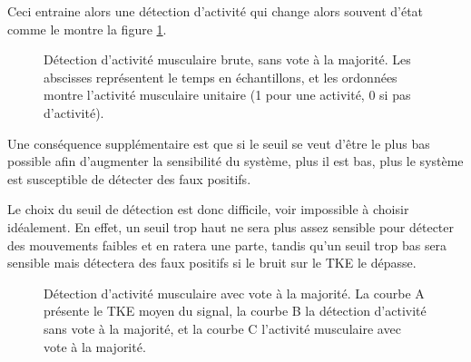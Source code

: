 \documentclass[letterpaper, twoside, 12pt, memoire, creativecommons, hyperref]{thETS}
\begin{document}
Ceci entraine alors une détection d'activité qui change alors souvent d'état comme le montre la figure \ref{fig:onsetSansVote}.

\begin{figure}
	\centering
	\caption{Détection d'activité musculaire brute, sans vote à la majorité. Les abscisses représentent le temps en échantillons, et les ordonnées montre l'activité musculaire unitaire (1 pour une activité, 0 si pas d'activité).}
	\label{fig:onsetSansVote}
\end{figure}

Une conséquence supplémentaire est que si le seuil se veut d'être le plus bas possible afin d'augmenter la sensibilité du système, plus il est bas, plus le système est susceptible de détecter des faux positifs. 

Le choix du seuil de détection est donc difficile, voir impossible à choisir idéalement. En effet, un seuil trop haut ne sera plus assez sensible pour détecter des mouvements faibles et en ratera une parte, tandis qu'un seuil trop bas sera sensible mais détectera des faux positifs si le bruit sur le TKE le dépasse.

\begin{figure}
	\centering
	\caption{Détection d'activité musculaire avec vote à la majorité. La courbe A présente le TKE moyen du signal, la courbe B la détection d'activité sans vote à la majorité, et la courbe C l'activité musculaire avec vote à la majorité.}
	\label{fig:onsetAvecVote}
\end{figure}
\end{document}
